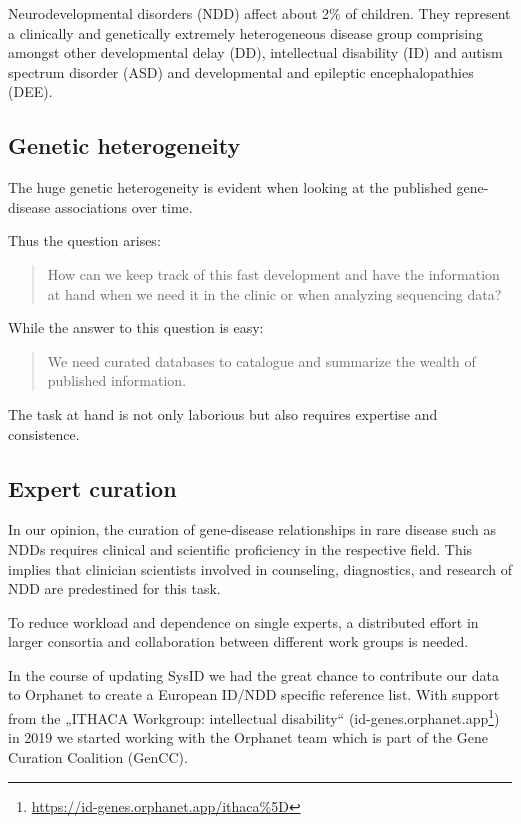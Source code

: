 \documentclass[
]{article}
\renewcommand{\href}[2]{#2\footnote{\url{#1}}}
\begin{document}
Neurodevelopmental disorders (NDD) affect about 2\% of children. They represent a clinically and genetically extremely heterogeneous disease group comprising amongst other developmental delay (DD), intellectual disability (ID) and autism spectrum disorder (ASD) and developmental and epileptic encephalopathies (DEE).

\hypertarget{genetic-heterogeneity}{%
\subsection{Genetic heterogeneity}\label{genetic-heterogeneity}}

The huge genetic heterogeneity is evident when looking at the published gene-disease associations over time.

Thus the question arises:

\begin{quote}
How can we keep track of this fast development and have the information at hand when we need it in the clinic or when analyzing sequencing data?
\end{quote}

While the answer to this question is easy:

\begin{quote}
We need curated databases to catalogue and summarize the wealth of published information.
\end{quote}

The task at hand is not only laborious but also requires expertise and consistence.

\hypertarget{expert-curation}{%
\subsection{Expert curation}\label{expert-curation}}

In our opinion, the curation of gene-disease relationships in rare disease such as NDDs requires clinical and scientific proficiency in the respective field. This implies that clinician scientists involved in counseling, diagnostics, and research of NDD are predestined for this task.

To reduce workload and dependence on single experts, a distributed effort in larger consortia and collaboration between different work groups is needed.

In the course of updating SysID we had the great chance to contribute our data to Orphanet to create a European ID/NDD specific reference list. With support from the „ITHACA Workgroup: intellectual disability`` (\href{https://id-genes.orphanet.app/ithaca\%5D}{id-genes.orphanet.app}) in 2019 we started working with the Orphanet team which is part of the Gene Curation Coalition (GenCC).
\end{document}
